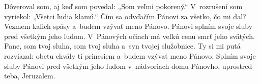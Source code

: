 Dôveroval som, aj keď som povedal:
„Som veľmi pokorený.“
\versseparator
V~rozrušení som vyriekol:
„Všetci ľudia klamú.“
\versseparator
Čím sa odvďačím Pánovi
za všetko, čo mi dal?
\versseparator
Vezmem kalich spásy
a~budem vzývať meno Pánovo.
\versseparator
Pánovi splním svoje sľuby
pred všetkým jeho ľudom.
\versseparator
V~Pánových očiach má veľkú cenu
smrť jeho svätých.
\versseparator
Pane, som tvoj sluha,
som tvoj sluha a~syn tvojej služobnice.
\versseparator
Ty si mi putá rozviazal:
obetu chvály tí prinesiem
a~budem vzývať meno Pánovo.
\versseparator
Splním svoje sľuby Pánovi
pred všetkým jeho ľudom
\versseparator
v~nádvoriach domu Pánovho,
uprostred teba, Jeruzalem.